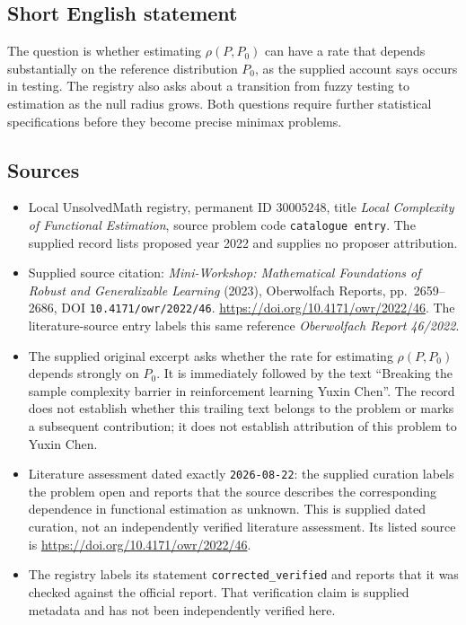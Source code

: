 \documentclass[11pt]{article}
\begin{document}
\subsection{Short English statement}
The question is whether estimating \(\rho(P,P_0)\) can have a rate that depends substantially on the reference distribution \(P_0\), as the supplied account says occurs in testing. The registry also asks about a transition from fuzzy testing to estimation as the null radius grows. Both questions require further statistical specifications before they become precise minimax problems.
\subsection{Sources}
\begin{itemize}
\item Local UnsolvedMath registry, permanent ID \(30005248\), title \emph{Local Complexity of Functional Estimation}, source problem code \texttt{catalogue entry}. The supplied record lists proposed year 2022 and supplies no proposer attribution.
\item Supplied source citation: \emph{Mini-Workshop: Mathematical Foundations of Robust and Generalizable Learning} (2023), Oberwolfach Reports, pp.\ 2659--2686, DOI \texttt{10.4171/owr/2022/46}. \url{https://doi.org/10.4171/owr/2022/46}. The literature-source entry labels this same reference \emph{Oberwolfach Report 46/2022}.
\item The supplied original excerpt asks whether the rate for estimating \(\rho(P,P_0)\) depends strongly on \(P_0\). It is immediately followed by the text ``Breaking the sample complexity barrier in reinforcement learning Yuxin Chen''. The record does not establish whether this trailing text belongs to the problem or marks a subsequent contribution; it does not establish attribution of this problem to Yuxin Chen.
\item Literature assessment dated exactly \texttt{2026-08-22}: the supplied curation labels the problem open and reports that the source describes the corresponding dependence in functional estimation as unknown. This is supplied dated curation, not an independently verified literature assessment. Its listed source is \url{https://doi.org/10.4171/owr/2022/46}.
\item The registry labels its statement \texttt{corrected\_verified} and reports that it was checked against the official report. That verification claim is supplied metadata and has not been independently verified here.
\end{itemize}
\end{document}

